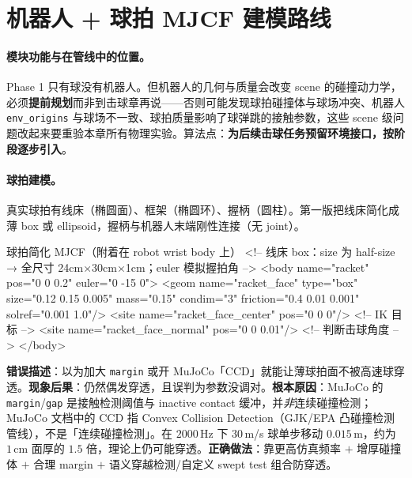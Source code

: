 \section{机器人 + 球拍 MJCF 建模路线}
\label{sec:rlmc-tennis-robot}

\paragraph{模块功能与在管线中的位置。}Phase 1 只有球没有机器人。但机器人的几何与质量会改变 scene 的碰撞动力学，必须\textbf{提前规划}而非到击球章再说——否则可能发现球拍碰撞体与球场冲突、机器人 \verb|env_origins| 与球场不一致、球拍质量影响了球弹跳的接触参数，这些 scene 级问题改起来要重验本章所有物理实验。算法点：\textbf{为后续击球任务预留环境接口，按阶段逐步引入}。

\paragraph{球拍建模。}真实球拍有线床（椭圆面）、框架（椭圆环）、握柄（圆柱）。第一版把线床简化成薄 box 或 ellipsoid，握柄与机器人末端刚性连接（无 joint）。

\begin{codebox}[text]{球拍简化 MJCF（附着在 robot wrist body 上）}
<!-- 线床 box：size 为 half-size → 全尺寸 24cm×30cm×1cm；euler 模拟握拍角 -->
<body name="racket" pos="0 0 0.2" euler="0 -15 0">
  <geom name="racket_face" type="box" size="0.12 0.15 0.005"
        mass="0.15" condim="3" friction="0.4 0.01 0.001" solref="0.001 1.0"/>
  <site name="racket_face_center" pos="0 0 0"/>     <!-- IK 目标 -->
  <site name="racket_face_normal" pos="0 0 0.01"/>  <!-- 判断击球角度 -->
</body>
\end{codebox}

\begin{pitfall}
\textbf{错误描述}：以为加大 \verb|margin| 或开 MuJoCo「CCD」就能让薄球拍面不被高速球穿透。\textbf{现象后果}：仍然偶发穿透，且误判为参数没调对。\textbf{根本原因}：MuJoCo 的 \texttt{margin}/\texttt{gap} 是接触检测阈值与 inactive contact 缓冲，并\emph{非}连续碰撞检测；MuJoCo 文档中的 CCD 指 Convex Collision Detection（GJK/EPA 凸碰撞检测管线），不是「连续碰撞检测」。在 $2000$\,Hz 下 $30$\,m/s 球单步移动 $0.015$\,m，约为 $1$\,cm 面厚的 $1.5$ 倍，理论上仍可能穿透。\textbf{正确做法}：靠更高仿真频率 $+$ 增厚碰撞体 $+$ 合理 margin $+$ 语义穿越检测/自定义 swept test 组合防穿透。
\end{pitfall}

